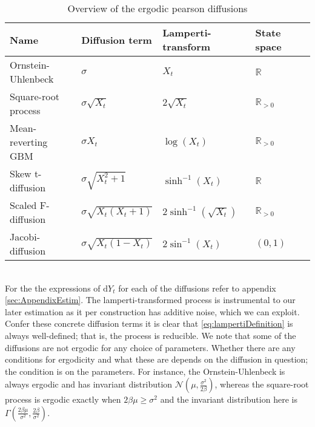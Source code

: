 \begin{table}[h!]
    \begin{center}
    \begin{tabular}{lllll}\hline
    \textbf{Name} & \textbf{Diffusion term} & \textbf{Lamperti-transform} & \textbf{State space}\\ \hline
    Ornstein-Uhlenbeck  & $\sigma$  & $X_t$ & $\mathbb{R}$ \\
    Square-root process & $\sigma\sqrt{X_t}$  & $ 2\sqrt{X_t}$ & $\mathbb{R}_{>0}$ \\
    Mean-reverting GBM  & $\sigma X_t $  & $ \log\left(X_t\right)$  & $\mathbb{R}_{>0}$ \\
    Skew t-diffusion  & $\sigma\sqrt{X_t^2 + 1}$  & $ \sinh^{-1}(X_t)$ & $\mathbb{R}$\\
    Scaled F-diffusion  & $\sigma\sqrt{X_t\left(X_t + 1\right)}$  & $ 2\sinh^{-1}\left(\sqrt{X_t}\right)$ & $\mathbb{R}_{>0}$ \\
    Jacobi-diffusion  & $\sigma\sqrt{X_t\left(1 - X_t\right)}$  & $ 2\sin^{-1}\left(X_t\right)$ & $(0, 1)$ \\ \hline
    \end{tabular}
    \caption{Overview of the ergodic pearson diffusions}
    \label{table:ergodicDiffusions}
\end{center}
\end{table}\\
For the the expressions of $\mathrm{d}Y_t$ for each of the diffusions refer to appendix \ref{sec:AppendixEstim}. The lamperti-transformed process is instrumental to our later estimation as it per construction has additive noise, which we can exploit. Confer these concrete diffusion terms it is clear that \ref{eq:lampertiDefinition} is always well-defined; that is, the process is reducible.  We note that some of the diffusions are not ergodic for any choice of parameters. Whether there are any conditions for ergodicity and what these are depends on the diffusion in question; the condition is on the parameters. For instance, the Ornstein-Uhlenbeck is always ergodic and has invariant distribution $\mathcal{N}\left(\mu, \frac{\sigma^2}{2\beta}\right)$, whereas the square-root process is ergodic exactly when $2\beta\mu\geq \sigma^2$ and the invariant distribution here is $\Gamma\left(\frac{2\beta\mu}{\sigma^2}, \frac{2\beta}{\sigma^2}\right)$. \\

